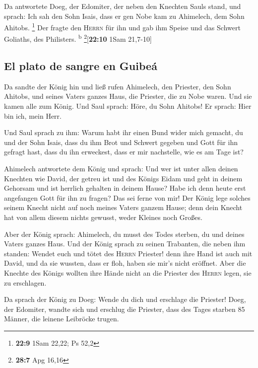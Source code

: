  Da antwortete Doeg, der Edomiter, der neben den Knechten
Sauls stand, und sprach: Ich sah den Sohn Isais, dass er gen Nobe kam zu
Ahimelech, dem Sohn Ahitobs. \footnote{\textbf{22:9} 1Sam 22,22; Ps 52,2}
 Der fragte den \textsc{Herrn} für ihn und gab ihm Speise
und das Schwert Goliaths, des Philisters. \textsuperscript{b}
\footnote{\textbf{28:7} Apg 16,16}{[}\textbf{22:10} 1Sam 21,7-10{]}

\hypertarget{el-plato-de-sangre-en-guibeuxe1}{%
\subsection{El plato de sangre en
Guibeá}\label{el-plato-de-sangre-en-guibeuxe1}}

 Da sandte der König hin und ließ rufen Ahimelech, den
Priester, den Sohn Ahitobs, und seines Vaters ganzes Haus, die Priester,
die zu Nobe waren. Und sie kamen alle zum König.  Und
Saul sprach: Höre, du Sohn Ahitobs! Er sprach: Hier bin ich, mein Herr.

 Und Saul sprach zu ihm: Warum habt ihr einen Bund wider
mich gemacht, du und der Sohn Isais, dass du ihm Brot und Schwert
gegeben und Gott für ihn gefragt hast, dass du ihn erweckest, dass er
mir nachstelle, wie es am Tage ist?

 Ahimelech antwortete dem König und sprach: Und wer ist
unter allen deinen Knechten wie David, der getreu ist und des Königs
Eidam und geht in deinem Gehorsam und ist herrlich gehalten in deinem
Hause?  Habe ich denn heute erst angefangen Gott für ihn
zu fragen? Das sei ferne von mir! Der König lege solches seinem Knecht
nicht auf noch meines Vaters ganzem Hause; denn dein Knecht hat von
allem diesem nichts gewusst, weder Kleines noch Großes.

 Aber der König sprach: Ahimelech, du musst des Todes
sterben, du und deines Vaters ganzes Haus.  Und der König
sprach zu seinen Trabanten, die neben ihm standen: Wendet euch und tötet
des \textsc{Herrn} Priester! denn ihre Hand ist auch mit David, und da
sie wussten, dass er floh, haben sie mir's nicht eröffnet. Aber die
Knechte des Königs wollten ihre Hände nicht an die Priester des
\textsc{Herrn} legen, sie zu erschlagen.

 Da sprach der König zu Doeg: Wende du dich und erschlage
die Priester! Doeg, der Edomiter, wandte sich und erschlug die Priester,
dass des Tages starben 85 Männer, die leinene Leibröcke trugen.

